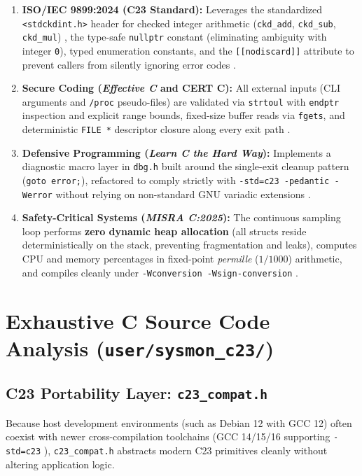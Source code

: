 \documentclass[11pt,a4paper]{article}
\begin{document}
\begin{enumerate}
\item \textbf{ISO/IEC 9899:2024 (C23 Standard):} Leverages the standardized \texttt{<stdckdint.h>} header for checked integer arithmetic (\texttt{ckd\_add}, \texttt{ckd\_sub}, \texttt{ckd\_mul}) \cite{gustedt2025,cppref_c23,cppref_numeric}, the type-safe \texttt{nullptr} constant (eliminating ambiguity with integer \texttt{0}), typed enumeration constants, and the \texttt{[[nodiscard]]} attribute to prevent callers from silently ignoring error codes \cite{gustedt2025}.
\item \textbf{Secure Coding (\emph{Effective C} and CERT C):} All external inputs (CLI arguments and \texttt{/proc} pseudo-files) are validated via \texttt{strtoul} with \texttt{endptr} inspection and explicit range bounds, fixed-size buffer reads via \texttt{fgets}, and deterministic \texttt{FILE *} descriptor closure along every exit path \cite{seacord2020}.
\item \textbf{Defensive Programming (\emph{Learn C the Hard Way}):} Implements a diagnostic macro layer in \texttt{dbg.h} built around the single-exit cleanup pattern (\texttt{goto error;}), refactored to comply strictly with \texttt{-std=c23 -pedantic -Werror} without relying on non-standard GNU variadic extensions \cite{shaw2015}.
\item \textbf{Safety-Critical Systems (\emph{MISRA C:2025}):} The continuous sampling loop performs \textbf{zero dynamic heap allocation} (all structs reside deterministically on the stack, preventing fragmentation and leaks), computes CPU and memory percentages in fixed-point \emph{permille} ($1/1000$) arithmetic, and compiles cleanly under \texttt{-Wconversion -Wsign-conversion} \cite{misra2025}.
\end{enumerate}

\section{Exhaustive C Source Code Analysis (\texttt{user/sysmon\_c23/})}

\subsection{C23 Portability Layer: \texttt{c23\_compat.h}}

Because host development environments (such as Debian 12 with GCC 12) often coexist with newer cross-compilation toolchains (GCC 14/15/16 supporting \texttt{-std=c23} \cite{gcc_dialect}), \texttt{c23\_compat.h} abstracts modern C23 primitives cleanly without altering application logic.
\end{document}
